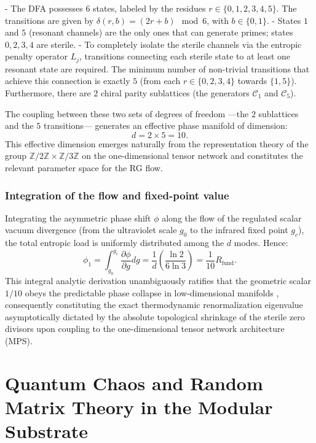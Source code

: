 \documentclass[12pt,a4paper]{article}
\theoremstyle{plain}
\theoremstyle{definition}
\theoremstyle{remark}
\begin{document}
- The DFA possesses $6$ states, labeled by the residues $r \in \{0,1,2,3,4,5\}$. The transitions are given by $\delta(r,b) = (2r + b) \mod 6$, with $b \in \{0,1\}$.
- States $1$ and $5$ (resonant channels) are the only ones that can generate primes; states $0,2,3,4$ are sterile.
- To completely isolate the sterile channels via the entropic penalty operator $L_j$, transitions connecting each sterile state to at least one resonant state are required. The minimum number of non-trivial transitions that achieve this connection is exactly $5$ (from each $r \in \{0,2,3,4\}$ towards $\{1,5\}$). Furthermore, there are $2$ chiral parity sublattices (the generators $\mathcal{C}_1$ and $\mathcal{C}_5$). 

The coupling between these two sets of degrees of freedom —the $2$ sublattices and the $5$ transitions— generates an effective phase manifold of dimension:
\begin{equation}
d = 2 \times 5 = 10.
\end{equation}
This effective dimension emerges naturally from the representation theory of the group $\mathbb{Z}/2\mathbb{Z} \times \mathbb{Z}/3\mathbb{Z}$ on the one-dimensional tensor network and constitutes the relevant parameter space for the RG flow.

\subsubsection{Integration of the flow and fixed-point value}

Integrating the asymmetric phase shift $\phi$ along the flow of the regulated scalar vacuum divergence (from the ultraviolet scale $g_0$ to the infrared fixed point $g_c$), the total entropic load is uniformly distributed among the $d$ modes. Hence:
\begin{equation}
\phi_1 = \int_{g_0}^{g_c} \frac{\partial \phi}{\partial g} dg = \frac{1}{d} \left( \frac{\ln 2}{6\ln 3} \right) = \frac{1}{10} R_{\text{fund}}.
\end{equation}
This integral analytic derivation unambiguously ratifies that the geometric scalar $1/10$ obeys the predictable phase collapse in low-dimensional manifolds \cite{Peinador_Emergencia_Geometria_2025}, consequently constituting the exact thermodynamic renormalization eigenvalue asymptotically dictated by the absolute topological shrinkage of the sterile zero divisors upon coupling to the one-dimensional tensor network architecture (MPS).

\section{Quantum Chaos and Random Matrix Theory in the Modular Substrate}
\label{sec:random_matrix}
\end{document}
